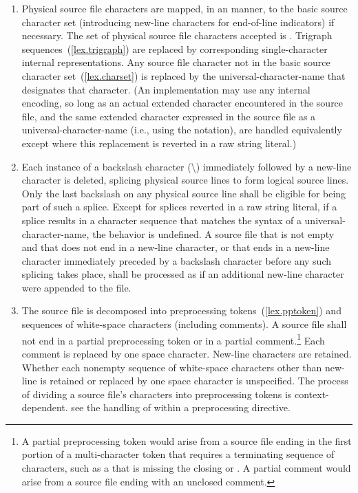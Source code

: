 \begin{enumerate}
%
%
%
\item Physical source file characters are mapped, in an
 manner,
to the basic source character set (introducing new-line characters for end-of-line
indicators) if necessary.
The set of physical source file characters accepted is .
Trigraph sequences~(\ref{lex.trigraph}) are
replaced by corresponding single-character internal representations. Any
source file character not in the basic source character
set~(\ref{lex.charset}) is replaced by the
universal-character-name that
designates that character. (An implementation may use any internal
encoding, so long as an actual extended character encountered in the
source file, and the same extended character expressed in the source
file as a universal-character-name (i.e., using the  notation), are handled equivalently
except where this replacement is reverted in a raw string literal.)

%
\item Each instance of a backslash character (\textbackslash)
immediately followed by a new-line character is deleted, splicing
physical source lines to form logical source lines. Only the last
backslash on any physical source line shall be eligible for being part
of such a splice.
Except for splices reverted in a raw string literal, if a splice results in
a character sequence that matches the
syntax of a universal-character-name, the behavior is
undefined. A source file that is not empty and that does not end in a new-line
character, or that ends in a new-line character immediately preceded by a
backslash character before any such splicing takes place,
shall be processed as if an additional new-line character were appended
to the file.

\item The source file is decomposed into preprocessing
tokens~(\ref{lex.pptoken}) and sequences of white-space characters
(including comments). A source file shall not end in a partial
preprocessing token or in a partial comment.\footnote{A partial preprocessing
token would arise from a source file
ending in the first portion of a multi-character token that requires a
terminating sequence of characters, such as a 
that is missing the closing 
or \tcode{>}. A partial comment
would arise from a source file ending with an unclosed \tcode{/*}
comment.}
Each comment is replaced by one space character. New-line characters are
retained. Whether each nonempty sequence of white-space characters other
than new-line is retained or replaced by one space character is
unspecified. The process of dividing a source file's
characters into preprocessing tokens is context-dependent.
\enterexample
see the handling of \tcode{<} within a  preprocessing
directive.
\exitexample


\end{enumerate}
